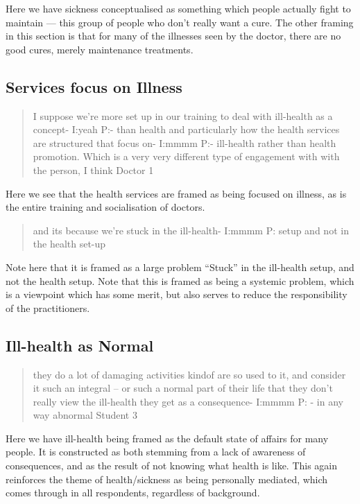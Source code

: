 Here we have sickness conceptualised as something which people actually fight to maintain --- this group of people who don't really want a cure. The other framing in this section is that for many of the illnesses seen by the doctor, there are no good cures, merely maintenance treatments. 


\subsection{Services focus on Illness}
\label{sec:serv-focus-illn}

\begin{quotation}
  I suppose we're more set up in our training to deal with ill-health as a concept-
I:yeah
P:- than health and particularly how the health services are structured that focus on-
I:mmmm
P:- ill-health rather than health promotion. Which is a very very different type of engagement with with the person, I think 
Doctor 1
\end{quotation}

Here we see that the health services are framed as being focused on illness, as is the entire training and socialisation of doctors. 

\begin{quotation}
   and its because we're stuck in the ill-health-
I:mmmm
P: setup and not in the health set-up

\end{quotation}

Note here that it is framed as a large problem ``Stuck'' in the ill-health setup, and not the health setup. Note that this is framed as being a systemic problem, which is a viewpoint which has some merit, but also serves to reduce the responsibility of the practitioners. 

\subsection{Ill-health as Normal}
\label{sec:illhealth-as-normal}

\begin{quotation}
   they do a lot of damaging activities kindof are so used to it, and consider it such an integral – or such a normal part of their life that they don't really view the ill-health they get as a consequence-
I:mmmm
P: - in any way abnormal
Student 3
\end{quotation}

Here we have ill-health being framed as the default state of affairs for many people. It is constructed as both stemming from a lack of awareness of consequences, and as the result of not knowing what health is like. This again reinforces the theme of health/sickness as being personally mediated, which comes through in all respondents, regardless of background. 

